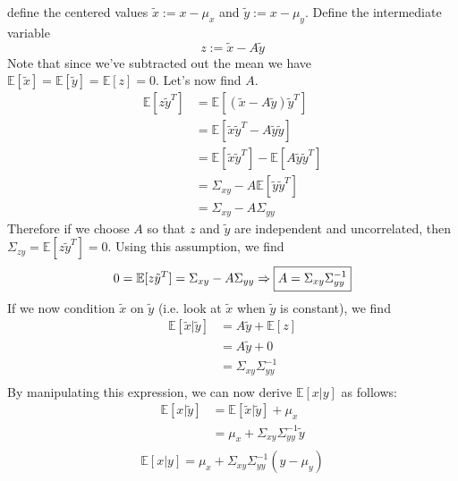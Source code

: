 define the centered values $\tilde{x} := x-\mu_x$ and $\tilde{y} := x-\mu_y$. Define the intermediate variable
\begin{equation}
    z := \tilde{x} - A\tilde{y}
\end{equation}
Note that since we've subtracted out the mean we have $\mathbb{E}[\tilde{x}] = \mathbb{E}[\tilde{y}] = \mathbb{E}[z] = 0$. Let's now find $A$.
\begin{align}
    \mathbb{E}[z\tilde{y}^T] &= \mathbb{E}[(\tilde{x}-A\tilde{y})\tilde{y}^T] \\
    &= \mathbb{E}[\tilde{x}\tilde{y}^T - A\tilde{y}\tilde{y}] \\
    &= \mathbb{E}[\tilde{x}\tilde{y}^T] - \mathbb{E}[A\tilde{y}\tilde{y}^T] \\
    &= \Sigma_{xy} - A\mathbb{E}[\tilde{y}\tilde{y}^T] \\
    &= \Sigma_{xy} - A\Sigma_{yy}
\end{align}
Therefore if we choose $A$ so that $z$ and $\tilde{y}$ are independent and uncorrelated, then $\Sigma_{zy} = \mathbb{E}[z\tilde{y}^T] = 0$. Using this assumption, we find
\begin{equation}
    0 = \mathbb{E}[z\tilde{y}^T] = \Sigma_{xy}-A\Sigma_{yy} \\ \Rightarrow \boxed{A = \Sigma_{xy}\Sigma_{yy}^{-1}}
\end{equation}
If we now condition $\tilde{x}$ on $\tilde{y}$ (i.e. look at $\tilde{x}$ when $\tilde{y}$ is constant), we find
\begin{align}
    \mathbb{E}[\tilde{x}\vert\tilde{y}] &= A\tilde{y} + \mathbb{E}[z] \\
    &= A\tilde{y} + 0 \\
    &= \Sigma_{xy}\Sigma_{yy}^{-1} \\
\end{align}
By manipulating this expression, we can now derive $\mathbb{E}[x\vert y]$ as follows:
\begin{align}
    \mathbb{E}[x\vert\tilde{y}] &= \mathbb{E}[\tilde{x}\vert\tilde{y}] + \mu_x \\
    &= \mu_x + \Sigma_{xy}\Sigma_{yy}^{-1}\tilde{y} \\
\end{align}
\begin{equation}
\boxed{\mathbb{E}[x\vert y] = \mu_x + \Sigma_{xy}\Sigma_{yy}^{-1}(y-\mu_y)}
\end{equation}

